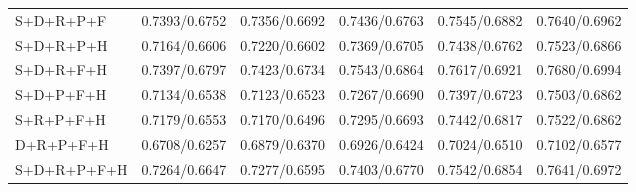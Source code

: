 \begin{longtable}{lrrrrr}
S+D+R+P+F & 0.7393/0.6752 & 0.7356/0.6692 & 0.7436/0.6763 & 0.7545/0.6882 & 0.7640/0.6962 \\
S+D+R+P+H & 0.7164/0.6606 & 0.7220/0.6602 & 0.7369/0.6705 & 0.7438/0.6762 & 0.7523/0.6866 \\
S+D+R+F+H & 0.7397/0.6797 & 0.7423/0.6734 & 0.7543/0.6864 & 0.7617/0.6921 & 0.7680/0.6994 \\
S+D+P+F+H & 0.7134/0.6538 & 0.7123/0.6523 & 0.7267/0.6690 & 0.7397/0.6723 & 0.7503/0.6862 \\
S+R+P+F+H & 0.7179/0.6553 & 0.7170/0.6496 & 0.7295/0.6693 & 0.7442/0.6817 & 0.7522/0.6862 \\
D+R+P+F+H & 0.6708/0.6257 & 0.6879/0.6370 & 0.6926/0.6424 & 0.7024/0.6510 & 0.7102/0.6577 \\
S+D+R+P+F+H & 0.7264/0.6647 & 0.7277/0.6595 & 0.7403/0.6770 & 0.7542/0.6854 & 0.7641/0.6972 \\
\end{longtable}
\endgroup
